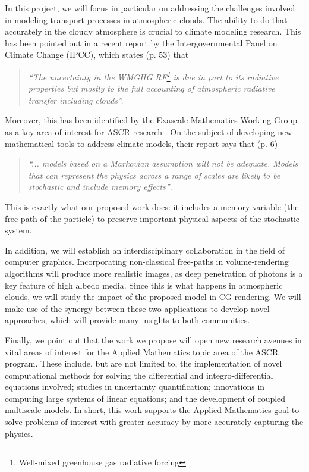 \documentclass[12pt]{article}
\begin{document}
In this project, we will focus in particular on addressing the challenges involved in modeling transport processes in atmospheric clouds.
The ability to do that accurately in the cloudy atmosphere is crucial to climate modeling research. 
This has been pointed out in a recent report\cite{ipcc13} by the Intergovernmental Panel on Climate Change (IPCC), which states (p. 53) that
\begin{quote}
\textit{``The uncertainty in the WMGHG RF\footnote{Well-mixed greenhouse gas radiative forcing} is due in part to its radiative properties but mostly to the full accounting of atmospheric radiative transfer including clouds''.}
\end{quote}

Moreover, this has been identified by the Exascale Mathematics Working Group as a key area of interest for ASCR research \cite{amrec14}.
On the subject of developing new mathematical tools to address climate models, their report says that (p. 6)   
\begin{quote}
\textit{``... models based on a Markovian assumption will not be adequate.
Models that can represent the physics across a range of scales are likely to be stochastic and include memory effects''}.
\end{quote} 
This is exactly what our proposed work does: it includes a memory variable (the free-path of the particle) to preserve important physical aspects of the stochastic system. 

In addition, we will establish an interdisciplinary collaboration in the field of computer graphics.
Incorporating non-classical free-paths in volume-rendering algorithms will produce more realistic images, as deep penetration of photons is a key feature of high albedo media.
Since this is what happens in atmospheric clouds, we will study the impact of the proposed model in CG rendering.
We will make use of the synergy between these two applications to develop novel approaches, which will provide many insights to both communities.

Finally, we point out that the work we propose will open new research avenues in vital areas of interest for the Applied Mathematics topic area of the ASCR program.
These include, but are not limited to, the implementation of novel computational methods for solving the differential and integro-differential equations involved; studies in uncertainty quantification; innovations in computing large systems of linear equations; and the development of coupled multiscale models.
In short, this work supports the Applied Mathematics goal to solve problems of interest with greater accuracy by more accurately capturing the physics.
\end{document}
